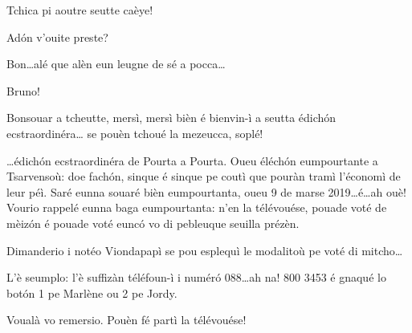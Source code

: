 \begin{drama}
\Noteospeaks Tchica pi aoutre seutte caèye!


\Noteospeaks {} Ad\'on v'ouite preste?


\Noteospeaks Bon\ldots alé que alèn eun leugne de sé a pocca\ldots 



\label{sigla}


\Noteospeaks Bruno!


\Brunospeaks Bonsouar a tcheutte, mersì, mersì bièn é bienvin-ì a seutta édich\'on ecstraordinéra\ldots {} se pouèn tchoué la mezeucca, soplé!


\Brunospeaks \ldots édich\'on ecstraordinéra de Pourta a Pourta. Oueu éléch\'on eumpourtante a  Tsarvensoù: doe fach\'on, sinque é sinque pe coutì que pouràn tramì l'économì de leur péì. Saré eunna souaré bièn eumpourtanta, oueu 9 de marse 2019\ldots é\ldots ah ouè! Vourio rappelé eunna baga eumpourtanta: n'en la télévouése, pouade voté de mèiz\'on é pouade voté eunc\'o vo di pebleuque seuilla prézèn.


\Brunospeaks {} Dimanderio i notéo Viondapapì se pou esplequì le modalitoù pe voté di mitcho\ldots

\Noteospeaks L'è seumplo: l'è suffizàn téléfoun-ì i num\'er\'o 088\ldots ah na! 800 3453 é gnaqué lo bot\'on 1 pe Marlène ou 2 pe Jordy.
 
\Brunospeaks Voualà vo remersio. Pouèn fé partì la télévouése!


\end{drama}
